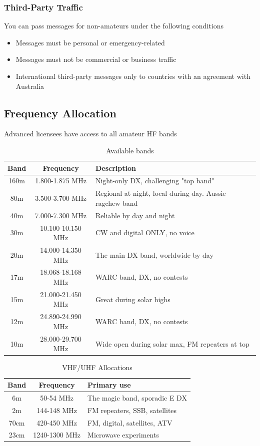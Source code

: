 \documentclass{article}
\begin{document}
\subsubsection{Third-Party Traffic}
You can pass messages for non-amateurs under the following conditions
\begin{itemize}
    \item Messages must be personal or emergency-related
    \item Messages must not be commercial or business traffic
    \item International third-party messages only to countries with an agreement with Australia
\end{itemize}

\subsection{Frequency Allocation}
Advanced licensees have access to all amateur HF bands
\begin{table}[h]
    \centering
    \caption{Available bands}
    \label{tab:11}
    \begin{tabular}{c|c|l}
        Band & Frequency & Description \\
        \hline
        \hline
        160m & 1.800-1.875 MHz & Night-only DX, challenging "top band" \\
        80m & 3.500-3.700 MHz & Regional at night, local during day. Aussie ragchew band \\
        40m & 7.000-7.300 MHz & Reliable by day and night \\
        30m & 10.100-10.150 MHz & CW and digital ONLY, no voice \\
        20m & 14.000-14.350 MHz & The main DX band, worldwide by day \\
        17m & 18.068-18.168 MHz & WARC band, DX, no contests \\
        15m & 21.000-21.450 MHz & Great during solar highs \\
        12m & 24.890-24.990 MHz & WARC band, DX, no contests \\
        10m & 28.000-29.700 MHz & Wide open during solar max, FM repeaters at top
    \end{tabular}
\end{table}

\begin{table}[h]
    \centering
    \caption{VHF/UHF Allocations}
    \label{tab:12}
    \begin{tabular}{c|c|l}
        Band & Frequency & Primary use \\
        \hline
        \hline
        6m & 50-54 MHz & The magic band, sporadic E DX \\
        2m & 144-148 MHz & FM repeaters, SSB, satellites \\
        70cm & 420-450 MHz & FM, digital, satellites, ATV \\
        23cm & 1240-1300 MHz & Microwave experiments
    \end{tabular}
\end{table}
\end{document}
